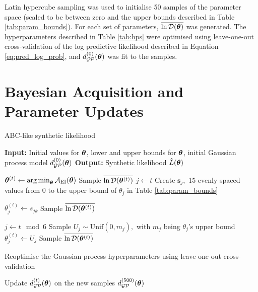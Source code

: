 Latin hypercube sampling was used to initialise 50 samples of the
parameter space (scaled to be between zero and the upper bounds described in
Table \ref{tab:param_bounds}). For each set of parameters,
$\overline{\ln\mathcal{D}(\bm{\theta})}$ was generated. The hyper\-parameters described in Table \ref{tab:hps}
were optimised using leave-one-out cross-validation of the log predictive
likelihood described in
Equation \ref{eq:pred_log_prob}, and $d_{\mathcal{GP}}^{(0)}(\bm{\theta})$ was
fit to the samples.

\section{Bayesian Acquisition and Parameter Updates}

\begin{algorithm}
    \caption{ABC-like synthetic likelihood}
    \label{alg:GP_reg}
    \begin{algorithmic}
        \State \textbf{Input:} Initial values for $\bm{\theta}$,
        lower and upper bounds for $\bm{\theta}$,
        initial Gaussian process model $d_{\mathcal{GP}}^{(0)}(\bm{\theta})$
        \State \textbf{Output:} Synthetic likelihood $\hat{L}(\bm{\theta})$

        \State
        $\bm{\theta}^{(t)} \gets \operatorname*{arg\,min}_{\bm{\theta}} \mathcal{A}_{\mathrm{EI}}(\bm{\theta})$
        \State Sample $\overline{\ln\mathcal{D}(\bm{\theta}^{(t)})}$
         
        \State $j \gets t$
        \State Create $\mathbf{s}_j,$ 15 evenly spaced values
        from 0 to the upper bound of $\theta_j$ in
        Table \ref{tab:param_bounds}

        \State $\theta^{(t)}_j \gets s_{jk}$
        \State Sample $\overline{\ln\mathcal{D}(\bm{\theta}^{(t)})}$
        \EndFor

        \Else
        \State $j\gets t\mod 6$ 
        \State Sample $U_j\sim \mathrm{Unif}(0, m_j),$ with $m_j$
        being $\theta_j$'s upper bound
        \State $\theta^{(t)}_j \gets U_j$
        \State Sample $\overline{\ln\mathcal{D}(\bm{\theta}^{(t)})}$
        \EndFor
        \EndIf

         
        \State Reoptimise the Gaussian process hyperparameters using
        leave-one-out cross-validation
        \EndIf

        \State Update $d_{\mathcal{GP}}^{(t)}(\bm{\theta})$ on the new samples
        \EndFor
        \State \Return $d_{\mathcal{GP}}^{(500)}(\bm{\theta})$
    \end{algorithmic}
\end{algorithm}


